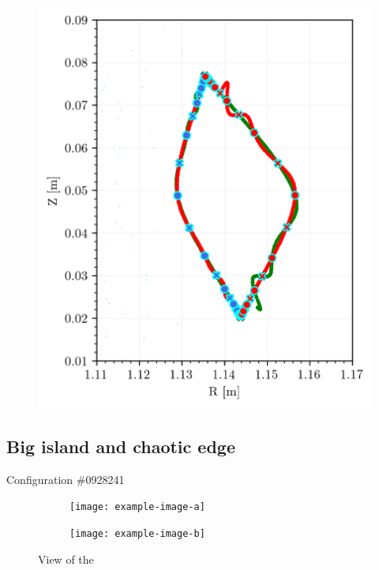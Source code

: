 \begin{subfigure}[t]{0.29\textwidth}
    \centering
    \includegraphics[width=\textwidth]{images/quasrs/clinic_outer_0229079.png}
    \caption{}
    \label{fig:0229079-turn}
\end{subfigure}

\subsection{Big island and chaotic edge}\label{sec:quars-0928241}
Configuration \#0928241

\begin{figure}[h!]
    \centering
    \begin{subfigure}[t]{0.49\textwidth}
        \centering
        \texttt{[image: example-image-a]}
        \caption{}
        \label{fig:}
    \end{subfigure}
    \hfill
    \begin{subfigure}[t]{0.49\textwidth}
        \centering
        \texttt{[image: example-image-b]}
        \caption{}
        \label{}
    \end{subfigure}
    \caption{View of the }
    \label{}
\end{figure}


